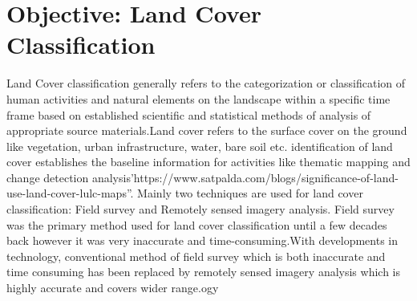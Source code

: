 \documentclass[12pt, a4paper]{report}
\begin{document}
\section{Objective: Land Cover Classification}
Land Cover classification generally refers to the categorization or classification of human activities and natural elements on the landscape within a specific time frame based on established scientific and statistical methods of analysis of appropriate source materials.Land cover refers to the surface cover on the ground like vegetation, urban infrastructure, water, bare soil etc. identification of land cover establishes the baseline information for activities like thematic mapping and change detection analysis'https://www.satpalda.com/blogs/significance-of-land-use-land-cover-lulc-maps''. Mainly two techniques are used for land cover classification: Field survey and Remotely sensed imagery analysis. Field survey was the primary method used for land cover classification until a few decades back however it was very inaccurate and time-consuming.With developments in technology, conventional method of field survey which is both inaccurate and time consuming has been replaced by remotely sensed imagery analysis which is highly accurate and covers wider range.ogy
\end{document}
